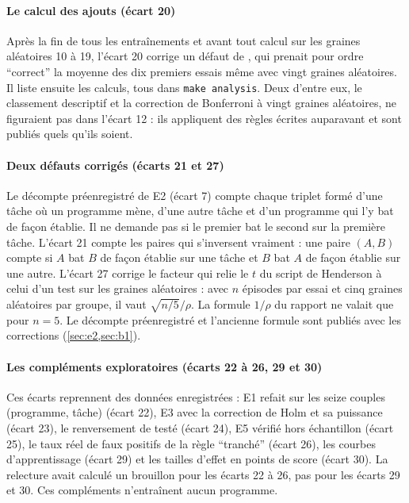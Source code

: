 \paragraph{Le calcul des ajouts (écart 20)} Après la fin de tous les
entraînements et avant tout calcul sur les graines aléatoires 10 à 19, l'écart 20 corrige un défaut
de , qui prenait pour ordre \enquote{correct} la moyenne des dix premiers
essais même avec vingt graines aléatoires. Il liste ensuite les calculs, tous dans \texttt{make
analysis}. Deux d'entre eux, le classement descriptif et la correction de Bonferroni à vingt graines
aléatoires, ne figuraient pas dans l'écart 12 : ils appliquent des règles écrites auparavant et
sont publiés quels qu'ils soient.

\paragraph{Deux défauts corrigés (écarts 21 et 27)} Le décompte préenregistré de E2 (écart 7) compte
chaque triplet formé d'une tâche où un programme mène, d'une autre tâche et d'un programme qui l'y
bat de façon établie. Il ne demande pas si le premier bat le second sur la première tâche. L'écart
21 compte les paires qui s'inversent vraiment : une paire $(A, B)$ compte si $A$ bat $B$ de façon
établie sur une tâche et $B$ bat $A$ de façon établie sur une autre. L'écart 27 corrige le facteur
qui relie le $t$ du script de Henderson à celui d'un test sur les graines aléatoires : avec $n$
épisodes par essai et cinq graines aléatoires par groupe, il vaut $\sqrt{n/5}/\rho$. La formule $1/\rho$ du rapport ne valait que pour $n = 5$. Le décompte préenregistré et l'ancienne formule sont publiés avec les corrections
(\cref{sec:e2,sec:b1}).

\paragraph{Les compléments exploratoires (écarts 22 à 26, 29 et 30)} Ces écarts reprennent des
données enregistrées : E1 refait sur les seize couples (programme, tâche) (écart 22), E3 avec la correction
de Holm et sa puissance (écart 23), le renversement de  testé (écart 24), E5 vérifié hors
échantillon (écart 25), le taux réel de faux positifs de la règle \enquote{tranché} (écart 26), les
courbes d'apprentissage (écart 29) et les tailles d'effet en points de score (écart 30). La relecture
avait calculé un brouillon pour les écarts 22 à 26, pas pour les écarts 29 et 30. Ces compléments
n'entraînent aucun programme.


